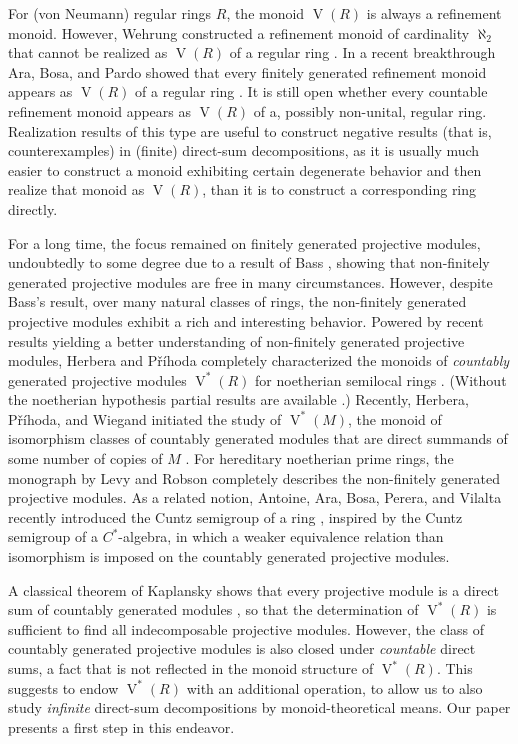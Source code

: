 \documentclass[a4paper,11pt,oneside]{amsart}
\theoremstyle{remark}
\DeclareMathOperator{\Vmon}{V}
\begin{document}
For (von Neumann) regular rings $R$, the monoid $\Vmon(R)$ is always a refinement monoid.
However, Wehrung constructed a refinement monoid of cardinality $\aleph_2$ that cannot be realized as $\Vmon(R)$ of a regular ring \cite{Frid}.
In a recent breakthrough Ara, Bosa, and Pardo showed that every finitely generated refinement monoid appears as $\Vmon(R)$ of a regular ring \cite{PJuan}.
It is still open whether every countable refinement monoid appears as $\Vmon(R)$ of a, possibly non-unital, regular ring.
Realization results of this type are useful to construct negative results (that is, counterexamples) in (finite) direct-sum decompositions, as it is usually much easier to construct a monoid exhibiting certain degenerate behavior and then realize that monoid as $\Vmon(R)$, than it is to construct a corresponding ring directly.

For a long time, the focus remained on finitely generated projective modules, undoubtedly to some degree due to a result of Bass \cite{Bass63}, showing that non-finitely generated projective modules are free in many circumstances.
However, despite Bass's result, over many natural classes of rings, the non-finitely generated projective modules exhibit a rich and interesting behavior.
Powered by recent results yielding a better understanding of non-finitely generated projective modules, Herbera and Příhoda completely characterized the monoids of \emph{countably} generated projective modules $\Vmon^*(R)$ for noetherian semilocal rings \cite{PavelHerbera}.
(Without the noetherian hypothesis partial results are available \cite{infinitepullback}.)
Recently, Herbera, Příhoda, and Wiegand initiated the study of $\Vmon^*(M)$, the monoid of isomorphism classes of countably generated modules that are direct summands of some number of copies of $M$ \cite{Herbera14,HerberaPrihoda14,HerberaPrihodaWiegand23}.
For hereditary noetherian prime rings, the monograph by Levy and Robson \cite[Chapter 8]{LevyRobson11} completely describes the non-finitely generated projective modules.
As a related notion, Antoine, Ara, Bosa, Perera, and Vilalta recently introduced the Cuntz semigroup of a ring \cite{AntoineAraBosaPereraVilalta25,AntoineAraBosaPereraVilalta26}, inspired by the Cuntz semigroup of a $C^*$-algebra, in which a weaker equivalence relation than isomorphism is imposed on the countably generated projective modules.

A classical theorem of Kaplansky shows that every projective module is a direct sum of countably generated modules \cite{Kaplansky58}, so that the determination of $\Vmon^*(R)$ is sufficient to find all indecomposable projective modules.
However, the class of countably generated projective modules is also closed under \emph{countable} direct sums, a fact that is not reflected in the monoid structure of $\Vmon^*(R)$.
This suggests to endow $\Vmon^*(R)$ with an additional operation, to allow us to also study \emph{infinite} direct-sum decompositions by monoid-theoretical means.
Our paper presents a first step in this endeavor.
\end{document}

